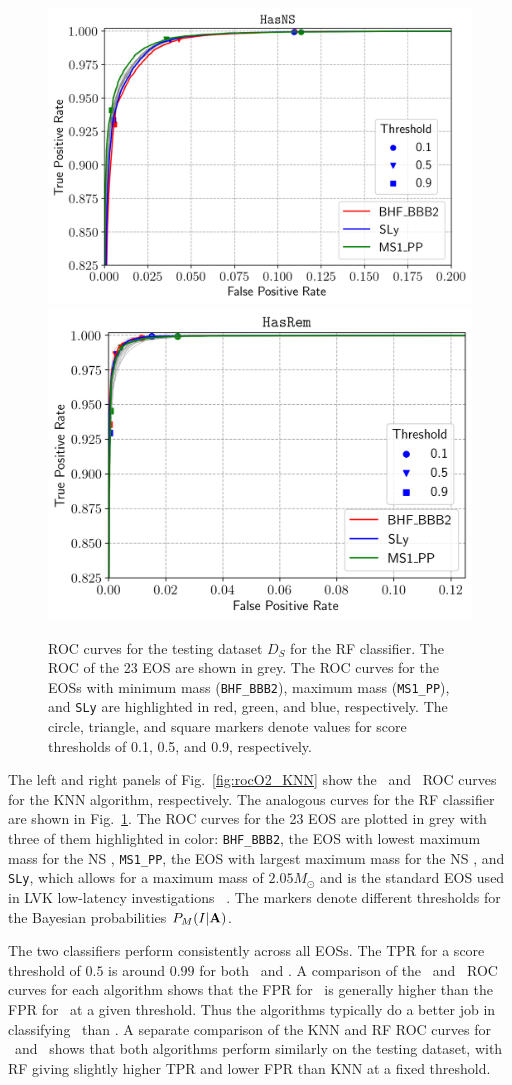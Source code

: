 \begin{figure}[h]
\includegraphics[width=0.45\linewidth]{roc_testing_RF_NS}
\includegraphics[width=0.45\linewidth]{roc_testing_RF_REM}
\caption{\ac{ROC} curves for the testing dataset $D_S$ for the \ac{RF} classifier. The \ac{ROC} of the 23 \ac{EOS} are shown in grey. The \ac{ROC} curves for the \ac{EOS}s with minimum mass ({\tt BHF\_BBB2}), maximum mass ({\tt MS1\_PP}), and {\tt SLy} are highlighted in red, green, and blue, respectively. The circle, triangle, and square markers denote values for score thresholds of 0.1, 0.5, and 0.9, respectively.}
\label{fig:rocO2_RF}
\end{figure}

The left and right panels of Fig.~\ref{fig:rocO2_KNN} show the \hasns\ and \hasrem\ \ac{ROC} curves for the \ac{KNN} algorithm, respectively. The analogous curves for the \ac{RF}
classifier are shown in Fig.~\ref{fig:rocO2_RF}. The \ac{ROC} curves for the 23 \ac{EOS} are plotted in grey with three of them highlighted in color: {\tt BHF\_BBB2}, the \ac{EOS} with
lowest maximum mass for the NS , {\tt MS1\_PP}, the \ac{EOS} with largest maximum mass for the \ac{NS} , and {\tt SLy}, which allows for a
maximum mass of $2.05 M_\odot$ and is the standard \ac{EOS} used in \ac{LVK} low-latency investigations~\cite{Chaudhary:2023vec} . The markers denote different thresholds for the Bayesian
probabilities $P_M(I|{\bf A})$. 


The two classifiers perform consistently across all \ac{EOS}s. The \ac{TPR} for a score threshold of $0.5$ is around $0.99$ for both \hasns\ and \hasrem. A comparison of the
\hasns\ and \hasrem\ \ac{ROC} curves for each algorithm shows that the \ac{FPR} for \hasns\ is generally higher than the \ac{FPR} for \hasrem\ at a given threshold. Thus the algorithms
typically do a better job in classifying \hasrem\ than \hasns. A separate comparison of the \ac{KNN} and \ac{RF} \ac{ROC} curves for \hasns\ and \hasrem\ shows that both algorithms perform
similarly on the testing dataset, with \ac{RF} giving slightly higher \ac{TPR} and lower \ac{FPR} than \ac{KNN} at a fixed threshold. 

